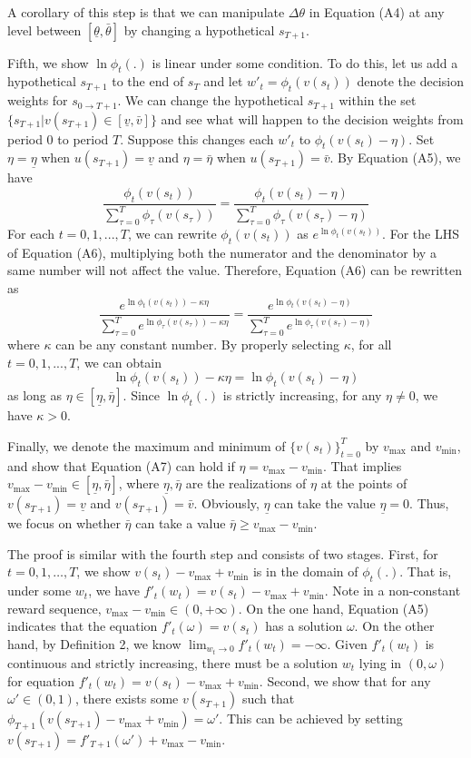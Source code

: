 \documentclass[
  12pt,
]{article}
\begin{document}
A corollary of this step is that we can manipulate \(\Delta \theta\) in
Equation (A4) at any level between \([\underline{\theta},\bar{\theta}]\)
by changing a hypothetical \(s_{T+1}\).

Fifth, we show \(\ln \phi_t(.)\) is linear under some condition. To do
this, let us add a hypothetical \(s_{T+1}\) to the end of \(s_T\) and
let \(w'_t=\phi_t(v(s_t))\) denote the decision weights for
\(s_{0\rightarrow T+1}\). We can change the hypothetical \(s_{T+1}\)
within the set \(\{s_{T+1}|v(s_{T+1})\in[\underline{v},\bar{v}]\}\) and
see what will happen to the decision weights from period 0 to period
\(T\). Suppose this changes each \(w'_t\) to \(\phi_t(v(s_t)-\eta)\).
Set \(\eta=\underline{\eta}\) when \(u(s_{T+1})=\underline{v}\) and
\(\eta=\bar{\eta}\) when \(u(s_{T+1})=\bar{v}\). By Equation (A5), we
have\[\tag{A6}
\frac{\phi_t(v(s_t))}{\sum_{\tau=0}^{T}\phi_\tau(v(s_\tau))} = \frac{\phi_t(v(s_t)-\eta)}{\sum_{\tau=0}^{T}\phi_\tau(v(s_\tau)-\eta)}
\]For each \(t=0,1,...,T\), we can rewrite \(\phi_t(v(s_t))\) as
\(e^{\ln \phi_t(v(s_t))}\). For the LHS of Equation (A6), multiplying
both the numerator and the denominator by a same number will not affect
the value. Therefore, Equation (A6) can be rewritten as \[
\frac{e^{\ln\phi_t(v(s_t))-\kappa\eta}}{\sum_{\tau=0}^{T}e^{\ln\phi_\tau(v(s_\tau))-\kappa\eta}} = \frac{e^{\ln\phi_t(v(s_t)-\eta)}}{\sum_{\tau=0}^{T}e^{\ln\phi_\tau(v(s_\tau)-\eta)}}
\]where \(\kappa\) can be any constant number. By properly selecting
\(\kappa\), for all \(t=0,1,...,T\), we can obtain\[\tag{A7}
\ln \phi_t(v(s_t))-\kappa\eta=\ln \phi_t(v(s_t)-\eta)
\]as long as \(\eta \in [\underline{\eta},\bar{\eta}]\). Since
\(\ln\phi_t(.)\) is strictly increasing, for any \(\eta\neq 0\), we have
\(\kappa>0\).

Finally, we denote the maximum and minimum of \(\{v(s_t)\}_{t=0}^T\) by
\(v_{\max}\) and \(v_{\min}\), and show that Equation (A7) can hold if
\(\eta = v_{\max} - v_{\min}\). That implies
\(v_{\max}-v_{\min}\in [\underline{\eta},\bar{\eta}]\), where
\(\underline{\eta}, \bar{\eta}\) are the realizations of \(\eta\) at the
points of \(v(s_{T+1})=\underline{v}\) and \(v(s_{T+1})=\bar{v}\).
Obviously, \(\underline{\eta}\) can take the value
\(\underline{\eta}=0\). Thus, we focus on whether \(\bar{\eta}\) can
take a value \(\bar{\eta}\geq v_{\max}-v_{\min}\).

The proof is similar with the fourth step and consists of two stages.
First, for \(t=0,1,…,T\), we show \(v(s_t)-v_{\max}+v_{\min}\) is in the
domain of \(\phi_t(.)\). That is, under some \(w_t\), we have
\(f'_t(w_t)=v(s_t)-v_{\max}+v_{\min}\). Note in a non-constant reward
sequence, \(v_{\max}-v_{\min}\in(0,+\infty)\). On the one hand, Equation
(A5) indicates that the equation \(f'_t(\omega)=v(s_t)\) has a solution
\(\omega\). On the other hand, by Definition 2, we know
\(\lim_{w_t\rightarrow 0}f'_t(w_t)=-\infty\). Given \(f'_t(w_t)\) is
continuous and strictly increasing, there must be a solution \(w_t\)
lying in \((0,\omega)\) for equation
\(f'_t(w_t)=v(s_t)-v_{\max}+v_{\min}\). Second, we show that for any
\(\omega'\in(0,1)\), there exists some \(v(s_{T+1})\) such that
\(\phi_{T+1}(v(s_{T+1})-v_{\max}+v_{\min})=\omega'\). This can be
achieved by setting \(v(s_{T+1})=f'_{T+1}(\omega')+v_{\max}-v_{\min}\).
\end{document}
